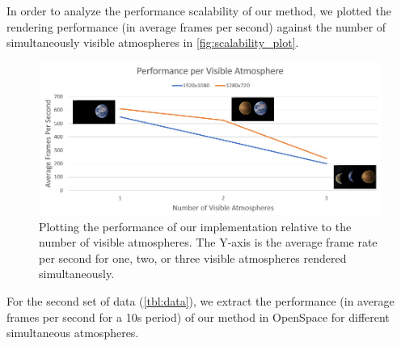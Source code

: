 \documentclass[preprint,journal]{vgtc}       %
\begin{document}
In order to analyze the performance scalability of our method, we plotted the rendering performance (in average frames per second) against the number of simultaneously visible atmospheres in \autoref{fig:scalability_plot}.

\begin{figure}[tbh]
  \centering
  \includegraphics[width=0.6\linewidth]{scalability.jpg}
  \caption{Plotting the performance of our implementation relative to the number of visible atmospheres. The Y-axis is the average frame rate per second for one, two, or three visible atmospheres rendered simultaneously.}
  \label{fig:scalability_plot}
\end{figure}

For the second set of data (\autoref{tbl:data}), we extract the performance (in average frames per second for a 10s period) of our method in OpenSpace for different simultaneous atmospheres.
\end{document}
